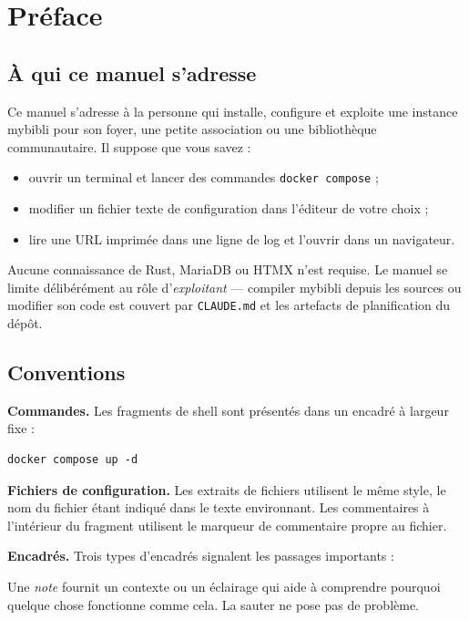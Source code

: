 \chapter*{Préface}

\section*{À qui ce manuel s'adresse}

Ce manuel s'adresse à la personne qui installe, configure et exploite
une instance mybibli pour son foyer, une petite association ou une
bibliothèque communautaire. Il suppose que vous savez :

\begin{itemize}
  \item ouvrir un terminal et lancer des commandes
        \texttt{docker compose} ;
  \item modifier un fichier texte de configuration dans l'éditeur de
        votre choix ;
  \item lire une URL imprimée dans une ligne de log et l'ouvrir dans
        un navigateur.
\end{itemize}

Aucune connaissance de Rust, MariaDB ou HTMX n'est requise. Le manuel
se limite délibérément au rôle d'\emph{exploitant} — compiler
mybibli depuis les sources ou modifier son code est couvert par
\texttt{CLAUDE.md} et les artefacts de planification du dépôt.

\section*{Conventions}

\textbf{Commandes.} Les fragments de shell sont présentés dans un
encadré à largeur fixe :

\begin{lstlisting}
docker compose up -d
\end{lstlisting}

\textbf{Fichiers de configuration.} Les extraits de fichiers utilisent
le même style, le nom du fichier étant indiqué dans le texte
environnant. Les commentaires à l'intérieur du fragment utilisent le
marqueur de commentaire propre au fichier.

\textbf{Encadrés.} Trois types d'encadrés signalent les passages
importants :

\begin{note}
Une \emph{note} fournit un contexte ou un éclairage qui aide à
comprendre pourquoi quelque chose fonctionne comme cela. La sauter
ne pose pas de problème.
\end{note}

